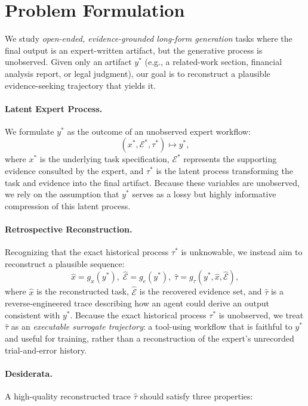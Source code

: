 \section{Problem Formulation}
\label{sec:problem}

We study \emph{open-ended, evidence-grounded long-form generation} tasks where the final output is an expert-written artifact, but the generative process is unobserved. Given only an artifact $y^{*}$ (e.g., a related-work section, financial analysis report, or legal judgment), our goal is to reconstruct a plausible evidence-seeking trajectory that yields it.  

\paragraph{Latent Expert Process.}
We formulate $y^*$ as the outcome of an unobserved expert workflow:
\begin{equation}
(x^*, \mathcal{E}^*, \tau^*) \mapsto y^*,
\end{equation}
where $x^*$ is the underlying task specification, $\mathcal{E}^{*}$ represents the supporting evidence consulted by the expert, and $\tau^*$ is the latent process transforming the task and evidence into the final artifact. Because these variables are unobserved, we rely on the assumption that $y^{*}$ serves as a lossy but highly informative compression of this latent process.  


\paragraph{Retrospective Reconstruction.}
Recognizing that the exact historical process $\tau^{*}$ is unknowable, we instead aim to reconstruct a plausible sequence:
\begin{equation}
\hat{x} = g_x(y^*), \;
\hat{\mathcal{E}} = g_e(y^*), \;
\hat{\tau} = g_\tau(y^*, \hat{x}, \hat{\mathcal{E}}),
\end{equation}
where $\hat{x}$ is the reconstructed task, $\hat{\mathcal{E}}$ is the recovered evidence set, and $\hat{\tau}$ is a reverse-engineered trace describing how an agent could derive an output consistent with $y^*$.
Because the exact historical process $\tau^{*}$ is unobserved, we treat $\hat{\tau}$ as an \emph{executable surrogate trajectory}: a tool-using workflow that is faithful to $y^{*}$ and useful for training, rather than a reconstruction of the expert's unrecorded trial-and-error history.

\paragraph{Desiderata.}
A high-quality reconstructed trace $\hat{\tau}$ should satisfy three properties:

